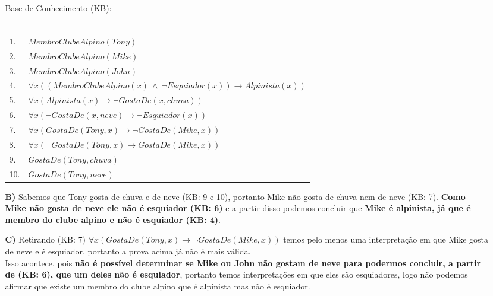 \documentclass[12pt]{article}
\begin{document}
\begin{itemize}
\begin{itemize}
					\begin{center}
						Base de Conhecimento (KB):\\ \hfill \\
						\begin{tabular}{l|l}
							1. & $MembroClubeAlpino(Tony)$\\
							2. & $MembroClubeAlpino(Mike)$\\
							3. & $MembroClubeAlpino(John)$\\
							4. & $\forall x ((MembroClubeAlpino(x) \ \wedge \ \neg Esquiador(x)) 
							\rightarrow Alpinista(x)) $ \\
							5. & $\forall x (Alpinista(x) \rightarrow \neg GostaDe(x, chuva)) $\\
							6. & $\forall x (\neg GostaDe(x, neve) \rightarrow \neg Esquiador(x))$\\
							7. & $\forall x (GostaDe(Tony, x) \rightarrow \neg GostaDe(Mike, x))$\\
							8. & $\forall x (\neg GostaDe(Tony, x) \rightarrow GostaDe(Mike, x))$\\
							9. & $GostaDe(Tony, chuva)$\\
							10. & $GostaDe(Tony, neve)$\\			
						\end{tabular}
					\end{center}
				\item[\textbf{B) }]
					\hfill\newline
					Sabemos que Tony gosta de chuva e de neve (KB: 9 e 10), portanto
					Mike não gosta de chuva nem de neve (KB: 7). \textbf{Como Mike não gosta
					de neve ele não é esquiador (KB: 6)} e a partir disso podemos
					concluir que \textbf{Mike é alpinista, já que é membro do clube alpino e
					não é esquiador (KB: 4)}.
				\item[\textbf{C) }]
					\hfill\newline	
					Retirando (KB: 7)  $\forall x (GostaDe(Tony, x) \rightarrow \neg GostaDe(Mike, 
					x))$ temos pelo menos uma interpretação em que Mike gosta de neve
					e é esquiador, portanto a prova acima já não é mais válida.\\
					Isso acontece, pois \textbf{não é possível determinar se Mike ou John não gostam 
					de neve para podermos concluir, a partir de (KB: 6), que um deles não é
					esquiador}, portanto temos interpretações em que eles são esquiadores,
					logo não podemos afirmar que existe um membro do clube alpino que é alpinista mas 
					não é esquiador.\\

\end{itemize}
\end{itemize}
\end{document}
